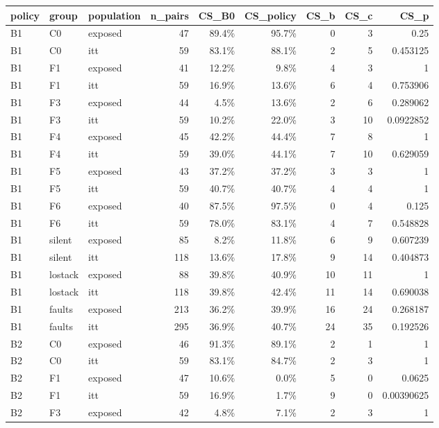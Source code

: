 \begin{tabular}{lllrrrrrr}
\toprule
policy & group & population & n\_pairs & CS\_B0 & CS\_policy & CS\_b & CS\_c & CS\_p \\
\midrule
B1 & C0 & exposed & 47 & 89.4\% & 95.7\% & 0 & 3 & 0.25 \\
B1 & C0 & itt & 59 & 83.1\% & 88.1\% & 2 & 5 & 0.453125 \\
B1 & F1 & exposed & 41 & 12.2\% & 9.8\% & 4 & 3 & 1 \\
B1 & F1 & itt & 59 & 16.9\% & 13.6\% & 6 & 4 & 0.753906 \\
B1 & F3 & exposed & 44 & 4.5\% & 13.6\% & 2 & 6 & 0.289062 \\
B1 & F3 & itt & 59 & 10.2\% & 22.0\% & 3 & 10 & 0.0922852 \\
B1 & F4 & exposed & 45 & 42.2\% & 44.4\% & 7 & 8 & 1 \\
B1 & F4 & itt & 59 & 39.0\% & 44.1\% & 7 & 10 & 0.629059 \\
B1 & F5 & exposed & 43 & 37.2\% & 37.2\% & 3 & 3 & 1 \\
B1 & F5 & itt & 59 & 40.7\% & 40.7\% & 4 & 4 & 1 \\
B1 & F6 & exposed & 40 & 87.5\% & 97.5\% & 0 & 4 & 0.125 \\
B1 & F6 & itt & 59 & 78.0\% & 83.1\% & 4 & 7 & 0.548828 \\
B1 & silent & exposed & 85 & 8.2\% & 11.8\% & 6 & 9 & 0.607239 \\
B1 & silent & itt & 118 & 13.6\% & 17.8\% & 9 & 14 & 0.404873 \\
B1 & lostack & exposed & 88 & 39.8\% & 40.9\% & 10 & 11 & 1 \\
B1 & lostack & itt & 118 & 39.8\% & 42.4\% & 11 & 14 & 0.690038 \\
B1 & faults & exposed & 213 & 36.2\% & 39.9\% & 16 & 24 & 0.268187 \\
B1 & faults & itt & 295 & 36.9\% & 40.7\% & 24 & 35 & 0.192526 \\
B2 & C0 & exposed & 46 & 91.3\% & 89.1\% & 2 & 1 & 1 \\
B2 & C0 & itt & 59 & 83.1\% & 84.7\% & 2 & 3 & 1 \\
B2 & F1 & exposed & 47 & 10.6\% & 0.0\% & 5 & 0 & 0.0625 \\
B2 & F1 & itt & 59 & 16.9\% & 1.7\% & 9 & 0 & 0.00390625 \\
B2 & F3 & exposed & 42 & 4.8\% & 7.1\% & 2 & 3 & 1 \\

\end{tabular}
